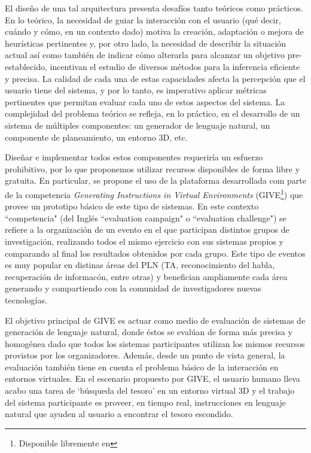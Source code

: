 El dise\~no de una tal arquitectura presenta
desaf\'ios tanto te\'oricos como pr\'acticos.  En lo te\'orico, la necesidad de
 guiar la interacci\'on con el usuario (qu\'e decir,
cu\'ando y c\'omo, en un contexto dado) motiva la creaci\'on, adaptaci\'on o mejora de heur\'isticas pertinentes y, por otro lado,  la necesidad de describir la situaci\'on actual as\'i como tambi\'en  de indicar c\'omo alterarla para alcanzar un objetivo pre-establecido, incentivan el estudio de diversos m\'etodos
para la inferencia eficiente y precisa.
La calidad de cada una de estas capacidades afecta la percepci\'on que
el usuario tiene del sistema, y por lo tanto, es imperativo aplicar m\'etricas pertinentes que permitan evaluar cada uno de estos aspectos del sistema.  La complejidad del problema te\'orico se
refleja, en lo pr\'actico, en el desarrollo de un sistema de m\'ultiples componentes: un
generador de lenguaje natural, un componente de planeamiento, un entorno 3D, etc.

Dise\~nar e implementar todos estos componentes requerir\'ia un esfuerzo prohibitivo, por lo que proponemos utilizar recursos disponibles de forma libre y gratuita. En particular, se propone el uso de la plataforma desarrollada com parte de la competencia \textit{Generating Instructions in Virtual Environments} (GIVE\footnote{Disponible libremente en  }) que
provee un prototipo b\'asico de este tipo de sistemas. En este contexto ``competencia" (del Ingl\'es ``evaluation campaign" o ``evaluation challenge") se refiere a la organizaci\'on de un evento en el que participan distintos grupos de investigaci\'on, realizando todos el mismo ejercicio con sus sistemas propios y comparando al final los resultados obtenidos por cada grupo. Este tipo de eventos es muy popular en distinas \'areas del PLN (TA, reconocimiento del habla, recuperaci\'on de informac\'on, entre otras) y benefician ampliamente cada \'area generando y compartiendo con la comunidad de investigadores nuevas tecnolog\'ias.

El objetivo principal de GIVE es actuar como medio de evaluaci\'on de sistemas de generaci\'on
de lenguaje natural, donde \'estos se eval\'uan de forma m\'as precisa y homog\'enea dado que todos los sistemas participantes utilizan los mismos recursos provistos por los organizadores. Adem\'as, desde un punto de vista general, la evaluaci\'on
tambi\'en tiene en cuenta el problema b\'asico de la interacci\'on en
entornos virtuales.  En el escenario propuesto por GIVE, el usuario
humano lleva acabo una tarea de `b\'usqueda del tesoro' en un entorno
virtual 3D y el trabajo del sistema participante es proveer, en tiempo
real, instrucciones en lenguaje natural que ayuden al usuario
a encontrar el tesoro escondido.

